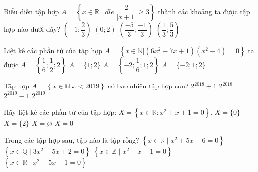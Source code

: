 \begin{ex}%
	Biểu diễn tập hợp $A=\left\{x\in\mathbb{R}\mid dle| \dfrac{2}{|x+1|}\ge3\right\}$ thành các khoảng ta được tập  hợp nào dưới đây?
	 \choice
		{$\left(-1;\dfrac{2}{3}\right)$} 
		 {$(0;2)$}
		{\True $\left(\dfrac{-5}{3};\dfrac{-1}{3}\right)$} 
		 {$\left(\dfrac{1}{3};\dfrac{5}{3}\right)$}
\end{ex}

\begin{ex}%
	Liệt kê các phần tử của tập hợp $A=\left\{x \in  \mathbb{N}|(6x^2-7x+1)(x^2-4)=0\right\}$ ta được
	\choice 
		 {$A=\left\{\dfrac{1}{6};\dfrac{1}{2};2\right\}$}
		 {\True $A=\{1;2\}$}
		 {$A=\left\{-2;\dfrac{1}{6};1;2\right\}$}
		{$A=\{-2;1;2\}$} 
\end{ex}

\begin{ex}%
	Tập hợp $A=\left\lbrace x\in\mathbb{N}|x<2019\right\rbrace $  có bao nhiêu tập hợp con?
	\choice 
		 {$2^{2018}+1$}
		 {$2^{2018}$}
		 {$2^{2019}-1$}
		{\True  $2^{2019}$}
\end{ex}

\begin{ex}%
	Hãy liệt kê các phần tử của  tập hợp: $X=\left\{x\in \mathbb{R}: x^2+x+1=0\right\}$.
	 \choice
		 {$X=\{0\}$}
		 {$X=\{2\}$}
		 {\True $X=\varnothing $}
		 {$X=0$}
\end{ex}

\begin{ex}%
	Trong các tập hợp  sau, tập nào là tập rỗng?
	 \choice
		{$\left\{x\in \mathbb{R}\mid  x^2+5x-6=0\right\}$}
		{$\left\{x\in \mathbb{Q}\mid  3x^2-5x+2=0\right\}$}
		 {\True $\left\{x\in \mathbb{Z}\mid x^2+x-1=0\right\}$}
		{$\left\{x\in \mathbb{R}\mid x^2+5x-1=0\right\}$} 
\end{ex}


